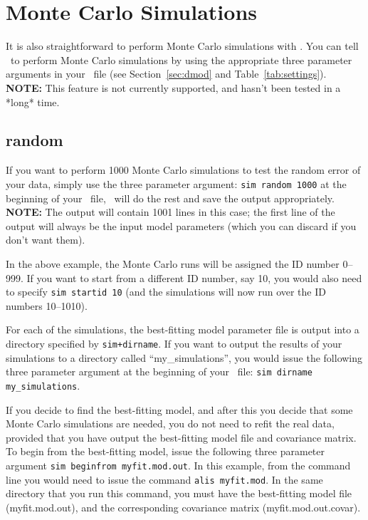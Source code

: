 \section{Monte Carlo Simulations}
\label{sec:montecarlo}

It is also straightforward to perform Monte Carlo simulations with \alis.
You can tell \alis\ to perform Monte Carlo simulations by using the
appropriate three parameter arguments in your \dmod\ file
(see Section~\ref{sec:dmod} and Table~\ref{tab:settings}).
\textbf{NOTE:} This feature is not currently supported, and hasn't
been tested in a *long* time.

\subsection{random}

If you want to perform 1000 Monte Carlo simulations to test the
random error of your data, simply use the three parameter
argument: \texttt{sim random 1000}
at the beginning of your \dmod\ file, \alis\ will do the rest and
save the output appropriately. \textbf{NOTE:} The output will
contain 1001 lines in this case; the first line of the output will
always be the input model parameters (which you can discard
if you don't want them).

In the above example, the Monte Carlo runs will be assigned
the ID number 0--999. If you want to start from a different ID number,
say 10, you would also need to specify \texttt{sim startid 10} (and the
simulations will now run over the ID numbers 10--1010).

For each of the simulations, the best-fitting model parameter file is
output into a directory specified by \texttt{sim+dirname}. If you want
to output the results of your simulations to a directory called
``my\_simulations'', you would issue the following three parameter
argument at the beginning of your \dmod\ file:
\texttt{sim dirname my\_simulations}.

If you decide to find the best-fitting model, and after this you decide that
some Monte Carlo simulations are needed, you do not need to refit the
real data, provided that you have output the best-fitting model file and
covariance matrix. To begin from the best-fitting model, issue the following
three parameter argument \texttt{sim beginfrom myfit.mod.out}. In this
example, from the command line you would need to issue the command
\texttt{alis myfit.mod}. In the same directory that you run this command,
you must have the best-fitting model file (myfit.mod.out), and the corresponding
covariance matrix (myfit.mod.out.covar).

